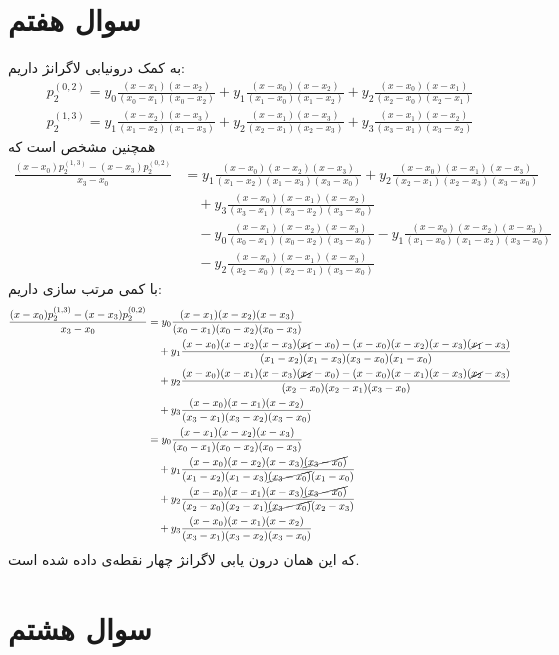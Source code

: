 \documentclass[]{article}
\begin{document}
\section*{سوال هفتم}
به کمک درونیابی لاگرانژ داریم:
\begin{gather*}
    p_2^{(0,2)} = y_0 \frac{(x-x_1)(x-x_2)}{(x_0-x_1)(x_0-x_2)} + y_1 \frac{(x-x_0)(x-x_2)}{(x_1-x_0)(x_1-x_2)} + y_2 \frac{(x-x_0)(x-x_1)}{(x_2-x_0)(x_2-x_1)}\\
    p_2^{(1,3)} = y_1 \frac{(x-x_2)(x-x_3)}{(x_1-x_2)(x_1-x_3)} + y_2 \frac{(x-x_1)(x-x_3)}{(x_2-x_1)(x_2-x_3)} + y_3 \frac{(x-x_1)(x-x_2)}{(x_3-x_1)(x_3-x_2)}
\end{gather*}
همچنین مشخص است که
\begin{align*}
    \frac{(x-x_0)p_2^{(1,3)} - (x-x_3)p_2^{(0,2)}}{x_3-x_0} &=
    y_1 \frac{(x-x_0)(x-x_2)(x-x_3)}{(x_1-x_2)(x_1-x_3)(x_3-x_0)} + y_2 \frac{(x-x_0)(x-x_1)(x-x_3)}{(x_2-x_1)(x_2-x_3)(x_3-x_0)}\\
    &\quad + y_3 \frac{(x-x_0)(x-x_1)(x-x_2)}{(x_3-x_1)(x_3-x_2)(x_3-x_0)}\\
    &\quad - y_0 \frac{(x-x_1)(x-x_2)(x-x_3)}{(x_0-x_1)(x_0-x_2)(x_3-x_0)} - y_1 \frac{(x-x_0)(x-x_2)(x-x_3)}{(x_1-x_0)(x_1-x_2)(x_3-x_0)}\\
    &\quad - y_2 \frac{(x-x_0)(x-x_1)(x-x_3)}{(x_2-x_0)(x_2-x_1)(x_3-x_0)}
\end{align*}
با کمی مرتب سازی داریم:
\begin{align*}
    \frac{(x-x_0)p_2^{(1,3)} - (x-x_3)p_2^{(0,2)}}{x_3-x_0} &=
    y_0 \frac{(x-x_1)(x-x_2)(x-x_3)}{(x_0-x_1)(x_0-x_2)(x_0-x_3)}\\
    &\quad + y_1 \frac{(x-x_0)(x-x_2)(x-x_3)(\cancel{x_1}-x_0)-(x-x_0)(x-x_2)(x-x_3)(\cancel{x_1}-x_3)}{(x_1-x_2)(x_1-x_3)(x_3-x_0)(x_1-x_0)}\\
    &\quad + y_2 \frac{(x-x_0)(x-x_1)(x-x_3)(\cancel{x_2}-x_0)-(x-x_0)(x-x_1)(x-x_3)(\cancel{x_2}-x_3)}{(x_2-x_0)(x_2-x_1)(x_3-x_0)}\\
    &\quad + y_3 \frac{(x-x_0)(x-x_1)(x-x_2)}{(x_3-x_1)(x_3-x_2)(x_3-x_0)}\\
    &= y_0 \frac{(x-x_1)(x-x_2)(x-x_3)}{(x_0-x_1)(x_0-x_2)(x_0-x_3)}\\
    &\quad + y_1 \frac{(x-x_0)(x-x_2)(x-x_3)\cancel{(x_3-x_0)}}{(x_1-x_2)(x_1-x_3)\cancel{(x_3-x_0)}(x_1-x_0)}\\
    &\quad + y_2 \frac{(x-x_0)(x-x_1)(x-x_3)\cancel{(x_3-x_0)}}{(x_2-x_0)(x_2-x_1)\cancel{(x_3-x_0)}(x_2-x_3)}\\
    &\quad + y_3 \frac{(x-x_0)(x-x_1)(x-x_2)}{(x_3-x_1)(x_3-x_2)(x_3-x_0)}
\end{align*}
که این همان درون یابی لاگرانژ چهار نقطه‌ی داده شده است.
\section*{سوال هشتم}
\end{document}
